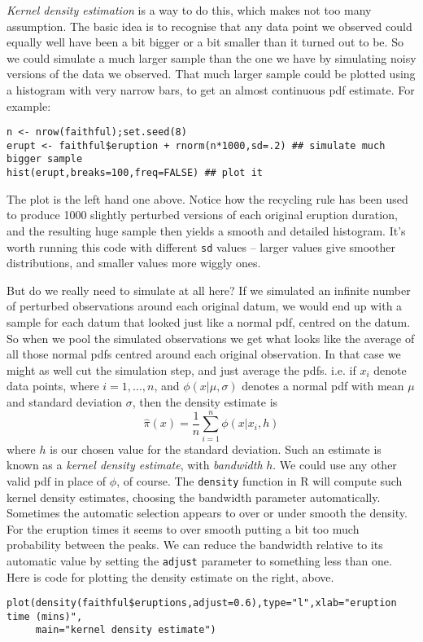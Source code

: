 \documentclass[10pt] {article}
\newcommand{\eps}[3]
{{\begin{center}
 \rotatebox{#1}{\scalebox{#2}{\texttt{[image: \#3]}}}
 \end{center}}
}
\theoremstyle{definition}
\begin{document}
{\em Kernel density estimation} is a way to do this, which makes not too many assumption. The basic idea is to recognise that any data point we observed could equally well have been a bit bigger or a bit smaller than it turned out to be. So we could simulate a much larger sample than the one we have by simulating noisy versions of the data we observed. That much larger sample could be plotted using a histogram with very narrow bars, to get an almost continuous pdf estimate. For example:
\begin{lstlisting}
n <- nrow(faithful);set.seed(8)
erupt <- faithful$eruption + rnorm(n*1000,sd=.2) ## simulate much bigger sample
hist(erupt,breaks=100,freq=FALSE) ## plot it
\end{lstlisting}   
\eps{-90}{.6}{geyser-kernel.eps}
The plot is the left hand one above. Notice how the recycling rule has been used to produce 1000 slightly perturbed versions of each original eruption duration, and the resulting huge sample then yields a smooth and detailed histogram. It's worth running this code with different \lstinline+sd+ values -- larger values give smoother distributions, and smaller values more wiggly ones. 

But do we really need to simulate at all here? If we simulated an infinite number of perturbed observations around each original datum, we would end up with a sample for each datum that looked just like a normal pdf, centred on the datum. So when we pool the simulated observations we get what looks like the average of all those normal pdfs centred around each original observation. In that case we might as well cut the simulation step, and just average the pdfs. i.e. if $x_i$ denote data points, where $i=1,\ldots,n$, and $\phi(x|\mu,\sigma)$ denotes a normal pdf with mean $\mu$ and standard deviation $\sigma$, then the density estimate is 
$$
\hat \pi (x) = \frac{1}{n} \sum_{i=1}^n \phi(x|x_i,h)
$$     
where $h$ is our chosen value for the standard deviation. Such an estimate is known as a {\em kernel density estimate}, with {\em bandwidth} $h$. We could use any other valid pdf in place of $\phi$, of course. The {\tt density} function in R will compute such kernel density estimates, choosing the bandwidth parameter automatically. Sometimes the automatic selection appears to over or under smooth the density. For the eruption times it seems to over smooth putting a bit too much probability between the peaks. We can reduce the bandwidth relative to its automatic value by setting the {\tt adjust} parameter to something less than one. Here is code for plotting the density estimate on the right, above.  
\begin{lstlisting}
plot(density(faithful$eruptions,adjust=0.6),type="l",xlab="eruption time (mins)",
     main="kernel density estimate")
\end{lstlisting}
\end{document}
